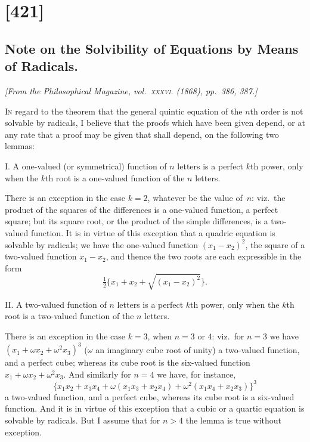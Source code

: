 \documentclass[11pt,a4paper]{article}
\theoremstyle{plain}
\theoremstyle{definition}
\begin{document}
\clearpage

\section{[421]}
\subsection{Note on the Solvibility of Equations by Means of Radicals.}

\begin{center}
\textit{[From the Philosophical Magazine, vol.~\textsc{xxxvi}. (1868), pp.~386, 387.]}
\end{center}

\textsc{In} regard to the theorem that the general quintic equation of the $n$th order is
not solvable by radicals, I believe that the proofs which have been given depend, or
at any rate that a proof may be given that shall depend, on the following two lemmas:

\medskip\noindent
\textsc{I.}  A one-valued (or symmetrical) function of $n$ letters is a perfect $k$th power,
only when the $k$th root is a one-valued function of the $n$ letters.

There is an exception in the case $k=2$, whatever be the value of~$n$: viz.\ the
product of the squares of the differences is a one-valued function, a perfect square;
but its square root, or the product of the simple differences, is a two-valued function.
It is in virtue of this exception that a quadric equation is solvable by radicals; we
have the one-valued function $(x_1-x_2)^2$, the square of a two-valued function
$x_1-x_2$, and thence the two roots are each expressible in the form
\[
\tfrac{1}{2}\{x_1+x_2 + \sqrt{(x_1-x_2)^2}\}.
\]

\medskip\noindent
\textsc{II.}  A two-valued function of $n$ letters is a perfect $k$th power, only when the
$k$th root is a two-valued function of the $n$ letters.

There is an exception in the case $k=3$, when $n=3$ or $4$: viz.\ for $n=3$ we have
$(x_1 + \omega x_2 + \omega^2 x_3)^3$ ($\omega$ an imaginary cube root of unity) a two-valued function,
and a perfect cube; whereas its cube root is the six-valued function
$x_1 + \omega x_2 + \omega^2 x_3$.  And similarly for $n=4$ we have, for instance,
\[
\{x_1x_2 + x_3x_4 + \omega(x_1x_3 + x_2x_4) + \omega^2(x_1x_4 + x_2x_3)\}^3
\]
a two-valued function, and a perfect cube, whereas its cube root is a six-valued
function.  And it is in virtue of this exception that a cubic or a quartic equation
is solvable by radicals.  But I assume that for $n>4$ the lemma is true without
exception.
\end{document}
